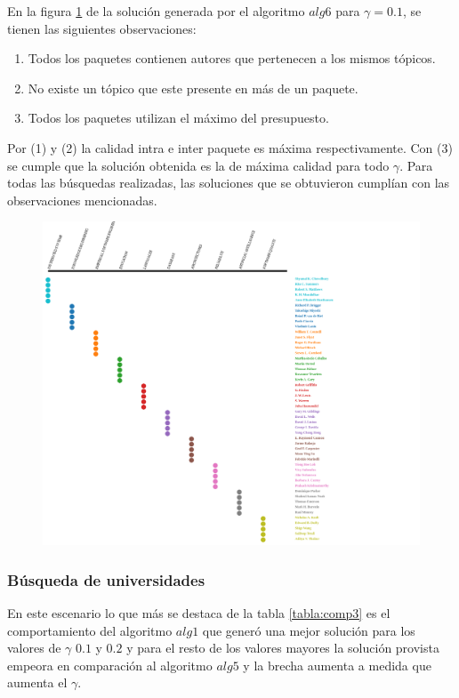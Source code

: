 En la figura \ref{res:aut-alg-6} de la solución generada por el algoritmo $alg6$ para $\gamma = 0.1$, se tienen las siguientes observaciones:
\begin{enumerate}
	\item Todos los paquetes contienen autores que pertenecen a los mismos tópicos. 
	\item No existe un tópico que este presente en más de un paquete.
	\item Todos los paquetes utilizan el máximo del presupuesto.
\end{enumerate}
Por (1) y (2) la calidad intra e inter paquete es máxima respectivamente. Con (3) se cumple que la solución obtenida es la de máxima calidad para todo $\gamma$. Para todas las búsquedas realizadas, las soluciones que se obtuvieron cumplían con las observaciones mencionadas.

\begin{figure}[H]
  \centering
    \includegraphics[width=1\textwidth]{img/aut-alg-6.png}
  \caption{}
  \label{res:aut-alg-6}
\end{figure}



\subsubsection{Búsqueda de universidades}
En este escenario lo que más se destaca de la tabla \ref{tabla:comp3} es el comportamiento del algoritmo $alg1$ que generó una mejor solución para los valores de $\gamma$ $0.1$ y $0.2$ y para el resto de los valores mayores la solución provista empeora en comparación al algoritmo $alg5$ y la brecha aumenta a medida que aumenta el $\gamma$. 


